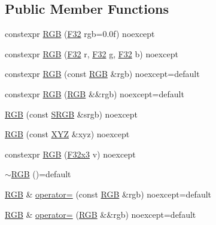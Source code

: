 \subsection*{Public Member Functions}
\begin{DoxyCompactItemize}
\item 
constexpr \mbox{\hyperlink{structmage_1_1_r_g_b_a166d2c13b46f9518c132c68f1117e5c6}{R\+GB}} (\mbox{\hyperlink{namespacemage_aa97e833b45f06d60a0a9c4fc22ae02c0}{F32}} rgb=0.\+0f) noexcept
\item 
constexpr \mbox{\hyperlink{structmage_1_1_r_g_b_af4304d8dc009f1b551442d6ebd15c0fa}{R\+GB}} (\mbox{\hyperlink{namespacemage_aa97e833b45f06d60a0a9c4fc22ae02c0}{F32}} r, \mbox{\hyperlink{namespacemage_aa97e833b45f06d60a0a9c4fc22ae02c0}{F32}} g, \mbox{\hyperlink{namespacemage_aa97e833b45f06d60a0a9c4fc22ae02c0}{F32}} b) noexcept
\item 
constexpr \mbox{\hyperlink{structmage_1_1_r_g_b_a1423c7c8dd83399b16cd33e367a5497c}{R\+GB}} (const \mbox{\hyperlink{structmage_1_1_r_g_b}{R\+GB}} \&rgb) noexcept=default
\item 
constexpr \mbox{\hyperlink{structmage_1_1_r_g_b_a852c4ed04bb38c7913d12fc491185bfb}{R\+GB}} (\mbox{\hyperlink{structmage_1_1_r_g_b}{R\+GB}} \&\&rgb) noexcept=default
\item 
\mbox{\hyperlink{structmage_1_1_r_g_b_a2f2c4eea3b0c44e0f31cfe20c6371d64}{R\+GB}} (const \mbox{\hyperlink{structmage_1_1_s_r_g_b}{S\+R\+GB}} \&srgb) noexcept
\item 
\mbox{\hyperlink{structmage_1_1_r_g_b_a62a2200960f84f1b6bd4b743510201a4}{R\+GB}} (const \mbox{\hyperlink{structmage_1_1_x_y_z}{X\+YZ}} \&xyz) noexcept
\item 
constexpr \mbox{\hyperlink{structmage_1_1_r_g_b_ab80d8120aabe4f52e8de6e99d1af7c8b}{R\+GB}} (\mbox{\hyperlink{namespacemage_a0fef5ab4e073c2d9ea876fefa3da4233}{F32x3}} v) noexcept
\item 
\mbox{\hyperlink{structmage_1_1_r_g_b_a2c01428e1da4ec354b85320a905beab3}{$\sim$\+R\+GB}} ()=default
\item 
\mbox{\hyperlink{structmage_1_1_r_g_b}{R\+GB}} \& \mbox{\hyperlink{structmage_1_1_r_g_b_a10fd47397bb4a691c951d44abfb77d7c}{operator=}} (const \mbox{\hyperlink{structmage_1_1_r_g_b}{R\+GB}} \&rgb) noexcept=default
\item 
\mbox{\hyperlink{structmage_1_1_r_g_b}{R\+GB}} \& \mbox{\hyperlink{structmage_1_1_r_g_b_add3b5995774c634d6e32af4d1cd6bfb3}{operator=}} (\mbox{\hyperlink{structmage_1_1_r_g_b}{R\+GB}} \&\&rgb) noexcept=default
\item 

\end{DoxyCompactItemize}
